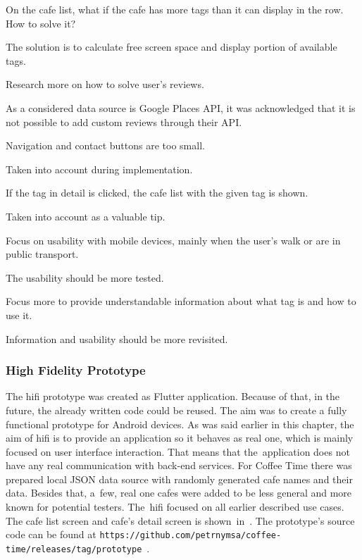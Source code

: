 \begin{questions}
  \item On the cafe list, what if the cafe has more tags than it can display in the row. How to solve it? 
         \begin{answer}
          The solution is to calculate free screen space and display portion of available tags.
         \end{answer}

  \item Research more on how to solve user's reviews.
         \begin{answer}
         As a considered data source is Google Places API, it was acknowledged that it is not possible to add custom reviews through their API.
         \end{answer}
    \item Navigation and contact buttons are too small. 
        \begin{answer}
        Taken into account during implementation.
        \end{answer}
    \item If the tag in detail is clicked, the cafe list with the given tag is shown.
        \begin{answer}
        Taken into account as a valuable tip.
        \end{answer}
    \item Focus on usability with mobile devices, mainly when the user's walk or are in public transport.
        \begin{answer}
        The usability should be more tested. 
        \end{answer}
    \item Focus more to provide understandable information about what tag is and how to use it.
     \begin{answer}
        Information and usability should be more revisited.
    \end{answer}
\end{questions}

\subsubsection{High Fidelity Prototype}
The \gls{hifi} prototype was created as Flutter application. Because of that, in the future, the already written code could be reused. The aim was to create a fully functional prototype for Android devices. As was said earlier in this chapter, the aim of \gls{hifi} is to provide an application so it behaves as real one, which is mainly focused on user interface interaction. That means that the~application does not have any real communication with back-end services. For Coffee Time there was prepared local JSON data source with randomly generated cafe names and their data. Besides that, a~few, real one cafes were added to be less general and more known for potential testers. The~\gls{hifi} focused on all earlier described use cases. The cafe list screen and cafe's detail screen is shown~in~. The prototype's source code can be found at \verb|https://github.com/petrnymsa/coffee-time/releases/tag/prototype|~\cite{hifi-prototype}. 

